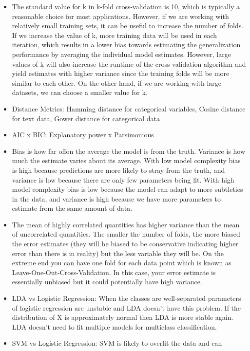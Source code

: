 \documentclass[]{book}
\begin{document}
\begin{itemize}
\item
  The standard value for k in k-fold cross-validation is 10, which is
  typically a reasonable choice for most applications. However, if we
  are working with relatively small training sets, it can be useful to
  increase the number of folds. If we increase the value of k, more
  training data will be used in each iteration, which results in a lower
  bias towards estimating the generalization performance by averaging
  the individual model estimates. However, large values of k will also
  increase the runtime of the cross-validation algorithm and yield
  estimates with higher variance since the training folds will be more
  similar to each other. On the other hand, if we are working with large
  datasets, we can choose a smaller value for k.
\item
  Distance Metrics: Hamming distance for categorical variables, Cosine
  distance for text data, Gower distance for categorical data
\item
  AIC x BIC: Explanatory power x Parsimonious
\item
  Bias is how far offon the average the model is from the truth.
  Variance is how much the estimate varies about its average. With low
  model complexity bias is high because predictions are more likely to
  stray from the truth, and variance is low because there are only few
  parameters being fit. With high model complexity bias is low because
  the model can adapt to more subtleties in the data, and variance is
  high because we have more parameters to estimate from the same amount
  of data.
\item
  The mean of highly correlated quantities has higher variance than the
  mean of uncorrelated quantities. The smaller the number of folds, the
  more biased the error estimates (they will be biased to be
  conservative indicating higher error than there is in reality) but the
  less variable they will be. On the extreme end you can have one fold
  for each data point which is known as Leave-One-Out-Cross-Validation.
  In this case, your error estimate is essentially unbiased but it could
  potentially have high variance.
\item
  LDA vs Logistic Regression: When the classes are well-separated
  parameters of logistic regression are unstable and LDA doesn't have
  this problem. If the distribution of X is approximately normal then
  LDA is more stable again. LDA doesn't need to fit multiple models for
  multiclass classification.
\item
  SVM vs Logistic Regression: SVM is likely to overfit the data and can

\end{itemize}
\end{document}
